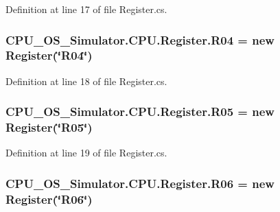 Definition at line 17 of file Register.\+cs.

\hypertarget{class_c_p_u___o_s___simulator_1_1_c_p_u_1_1_register_aa86ab37f2ba652b534b8a6d4d338603e}{}
\subsubsection[{R04}]{ C\+P\+U\+\_\+\+O\+S\+\_\+\+Simulator.\+C\+P\+U.\+Register.\+R04 = new {\bf Register}(\char`\"{}R04\char`\"{})\hspace{0.3cm}{\ttfamily [static]}}\label{class_c_p_u___o_s___simulator_1_1_c_p_u_1_1_register_aa86ab37f2ba652b534b8a6d4d338603e}


Definition at line 18 of file Register.\+cs.

\hypertarget{class_c_p_u___o_s___simulator_1_1_c_p_u_1_1_register_a68c78defdae216e7110a284464e1ec64}{}
\subsubsection[{R05}]{ C\+P\+U\+\_\+\+O\+S\+\_\+\+Simulator.\+C\+P\+U.\+Register.\+R05 = new {\bf Register}(\char`\"{}R05\char`\"{})\hspace{0.3cm}{\ttfamily [static]}}\label{class_c_p_u___o_s___simulator_1_1_c_p_u_1_1_register_a68c78defdae216e7110a284464e1ec64}


Definition at line 19 of file Register.\+cs.

\hypertarget{class_c_p_u___o_s___simulator_1_1_c_p_u_1_1_register_a643141b987101b5bc93f99d04faecca8}{}
\subsubsection[{R06}]{ C\+P\+U\+\_\+\+O\+S\+\_\+\+Simulator.\+C\+P\+U.\+Register.\+R06 = new {\bf Register}(\char`\"{}R06\char`\"{})\hspace{0.3cm}{\ttfamily [static]}}\label{class_c_p_u___o_s___simulator_1_1_c_p_u_1_1_register_a643141b987101b5bc93f99d04faecca8}


